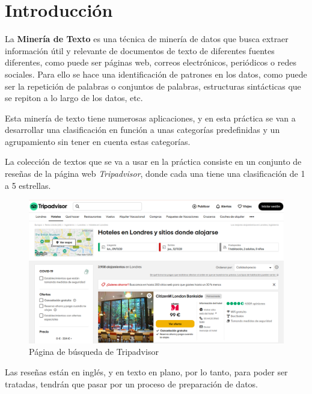 \documentclass[12pt,a4paper, xcolor=table]{article}
\begin{document}
\section{Introducción}

    La \textbf{Minería de Texto} es una técnica de minería de datos que busca extraer información útil y relevante de documentos de texto de diferentes fuentes diferentes, como puede ser páginas web, correos electrónicos, periódicos o redes sociales. Para ello se hace una identificación de patrones en los datos, como puede ser la repetición de palabras o conjuntos de palabras, estructuras sintácticas que se repiton a lo largo de los datos, etc.

    \vspace{3mm}

    Esta minería de texto tiene numerosas aplicaciones, y en esta práctica se van a desarrollar una clasificación en función a unas categorías predefinidas y un agrupamiento sin tener en cuenta estas categorías.

    \vspace{2mm}

    La colección de textos que se va a usar en la práctica consiste en un conjunto de reseñas de la página web \textit{Tripadvisor}, donde cada una tiene una clasificación de 1 a 5 estrellas.

    \begin{figure}[!h]
      \centering
      \includegraphics[width=14cm]{img/tripadvisor-main.png}
      \caption{Página de búsqueda de Tripadvisor}
    \end{figure}

    Las reseñas están en inglés, y en texto en plano, por lo tanto, para poder ser tratadas, tendrán que pasar por un proceso de preparación de datos.
\end{document}
